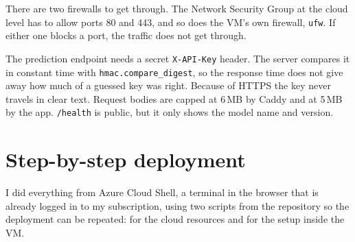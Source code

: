 There are two firewalls to get through. The Network Security Group at the cloud level has to allow
ports 80 and 443, and so does the VM's own firewall, \texttt{ufw}. If either one blocks a port, the
traffic does not get through.

The prediction endpoint needs a secret \texttt{X-API-Key} header. The server compares it in
constant time with \texttt{hmac.compare\_digest}, so the response time does not give away how much
of a guessed key was right. Because of HTTPS the key never travels in clear text. Request bodies
are capped at 6\,MB by Caddy and at 5\,MB by the app. \texttt{/health} is public, but it only shows
the model name and version.

\section*{Step-by-step deployment}
I did everything from Azure Cloud Shell, a terminal in the browser that is already logged in to my
subscription, using two scripts from the repository so the deployment can be repeated:
 for the cloud resources and  for the
setup inside the VM.
